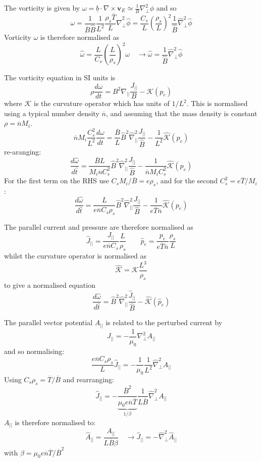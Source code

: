 \documentclass[12pt]{article}
\newcommand{\bvec}{\ensuremath{\underline{b}}}
\begin{document}
The vorticity is given by $\omega = \bvec\cdot\nabla\times \mathbf{v}_E \simeq \frac{1}{B}\nabla_\perp^2\phi$ and so
\[
\omega = \frac{1}{\overline{B}\hat{B}}\frac{1}{L^2}\frac{\rho_s\overline{T}}{L}\hat{\nabla}_\perp^2\hat{\phi} = \frac{C_s}{L}\left(\frac{\rho_s}{L}\right)^2\frac{1}{\hat{B}}\hat{\nabla}_\perp^2\hat{\phi}
\]
Vorticity $\omega$ is therefore normalised as
\[
\boxed{\hat{\omega} = \frac{L}{C_s}\left(\frac{L}{\rho_s}\right)^2\omega} \quad \rightarrow \hat{\omega} = \frac{1}{\hat{B}}\hat{\nabla}_\perp^2\hat{\phi}
\]

The vorticity equation in SI units is
\[
\rho\frac{d\omega}{dt} = B^2\nabla_{||}\frac{J_{||}}{B} - \mathcal{K}\left(p_e\right)
\]
where $\mathcal{K}$ is the curvature operator which has units of $1/L^2$.
This is normalised using a typical number density $\overline{n}$, and assuming that the mass density is constant
$\rho = \overline{n}M_i$.
\[
\overline{n}M_i\frac{C_s^2}{L^2}\frac{d\omega}{dt} = \frac{\overline{B}}{L}\hat{B}^2\hat{\nabla}_{||}^2\frac{J_{||}}{\hat{B}} - \frac{1}{L^2}\hat{\mathcal{K}}\left(p_e\right)
\]
re-aranging:
\[
\frac{d\hat{\omega}}{d\hat{t}} = \frac{\overline{B}L}{M_i\overline{n}C_s^2}\hat{B}^2\hat{\nabla}_{||}^2\frac{J_{||}}{\hat{B}} - \frac{1}{\overline{n}M_iC_s^2}\hat{\mathcal{K}}\left(p_e\right)
\]
For the first term on the RHS use $C_sM_i / \overline{B} = e\rho_s$, and for the second $C_s^2 = e\overline{T}/M_i$:
\[
\frac{d\hat{\omega}}{d\hat{t}} = \frac{L}{e\overline{n}C_s\rho_s}\hat{B}^2\hat{\nabla}_{||}^2\frac{J_{||}}{\hat{B}} - \frac{1}{e\overline{T}\overline{n}}\hat{\mathcal{K}}\left(p_e\right)
\]

The parallel current and pressure are therefore normalised as
\[
\boxed{\hat{J}_{||} = \frac{J_{||}}{e\overline{n}C_s}\frac{L}{\rho_s}} \qquad \boxed{\hat{p}_e = \frac{p_e}{e\overline{T}\overline{n}}\frac{\rho_s}{L}}
\]
whilst the curvature operator is normalised as
\[
\boxed{\hat{\mathcal{K}} = \mathcal{K}\frac{L^3}{\rho_s}}
\]
to give a normalised equation
\[
\frac{d\hat{\omega}}{d\hat{t}} = \hat{B}^2\hat{\nabla}_{||}^2\frac{\hat{J}_{||}}{\hat{B}} - \hat{\mathcal{K}}\left(\hat{p}_e\right)
\]

The parallel vector potential $A_{||}$ is related to the perturbed current by
\[
J_{||} = -\frac{1}{\mu_0}\nabla_\perp^2 A_{||}
\]
and so normalising:
\[
\frac{e\overline{n}C_s\rho_s}{L}\hat{J}_{||} = -\frac{1}{\mu_0}\frac{1}{L^2}\hat{\nabla}_\perp^2A_{||}
\]
Using $C_s\rho_s = \overline{T}/\overline{B}$ and rearranging:
\[
\hat{J}_{||} = -\underbrace{\frac{\overline{B}^2}{\mu_0 e\overline{n}\overline{T}}}_{1/\beta}\frac{1}{L\overline{B}}\hat{\nabla}_\perp^2 A_{||}
\]
$A_{||}$ is therefore normalised to:
\[
\boxed{\hat{A}_{||} = \frac{A_{||}}{L\overline{B}\beta}} \quad \rightarrow \hat{J}_{||} = -\hat{\nabla}_\perp^2 \hat{A}_{||}
\]
with $\beta = \mu_0 e\overline{n}\overline{T}/\overline{B}^2$
\end{document}
